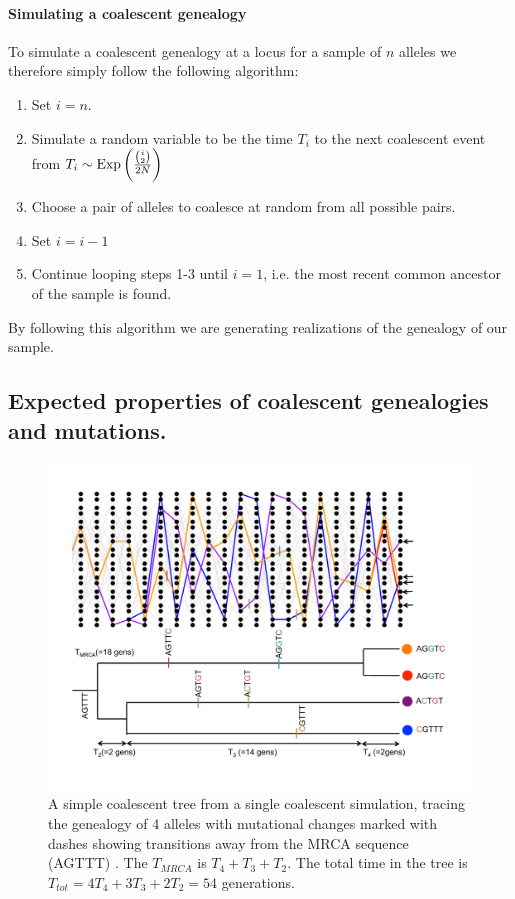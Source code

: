 \paragraph{Simulating a coalescent genealogy}
To simulate a coalescent genealogy at a locus for a sample of $n$ alleles we therefore simply follow the following
algorithm:
\begin{enumerate}
\item Set $i=n$.
\item Simulate a random variable to be the time $T_i$ to the next coalescent event from $T_i \sim
  \text{Exp}\left(\nicefrac{{i \choose
 2}}{2N} \right)$
\item Choose a pair of alleles to coalesce at random from all possible
 pairs.
\item Set $i=i-1$
\item Continue looping steps 1-3 until $i=1$, i.e. the most recent
 common ancestor of the sample is found.
\end{enumerate}
By following this algorithm we are generating realizations of the
genealogy of our sample. \\



\subsection{Expected properties of coalescent genealogies and
  mutations.} 

\begin{figure}
\begin{center}
\includegraphics[width= \textwidth]{figures/Coalescent/Coal_w_muts.pdf}
\end{center}
\caption{A simple coalescent tree from a single coalescent simulation, tracing the genealogy of 4 alleles with mutational changes marked with dashes showing transitions away from the MRCA sequence (AGTTT) . The $T_{MRCA}$ is $T_4+T_3+T_2$. The total time in the tree is $T_{tot}=4 T_4+3T_3 + 2T_2= 54$ generations.   } \label{fig:Coal_w_muts}
\end{figure}


